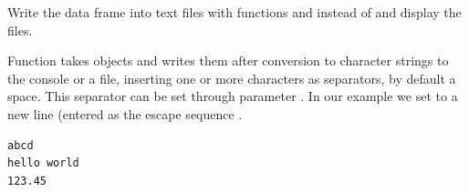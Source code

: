 \documentclass[krantz2]{krantz}\usepackage{knitr}%
\begin{document}
\begin{playground}
Write the data frame  into text files with functions  and  instead of  and display the files.
\end{playground}

Function  takes \Rlang objects and writes them after conversion to character strings to the console or a file, inserting one or more characters as separators, by default a space. This separator can be set through parameter . In our example we set  to a new line (entered as the escape sequence .

\begin{knitrout}\footnotesize
{}\color{fgcolor}\begin{kframe}
\begin{alltt}
 \hlkwb{<-} \hlstd{(}\hlstd{,} \hlstd{,} \hlstd{)}
  \hlstd{=} \hlstd{,}  \hlstd{=} \hlstd{)}
\hlstd{(}\hlstd{,}  \hlstd{=} \hlstd{)}
\end{alltt}
\end{kframe}
\end{knitrout}

\begin{knitrout}\footnotesize
{}\color{fgcolor}\begin{kframe}
\begin{verbatim}
abcd
hello world
123.45
\end{verbatim}
\end{kframe}
\end{knitrout}

\subsection[readr]{}\label{sec:files:readr}
\end{document}
